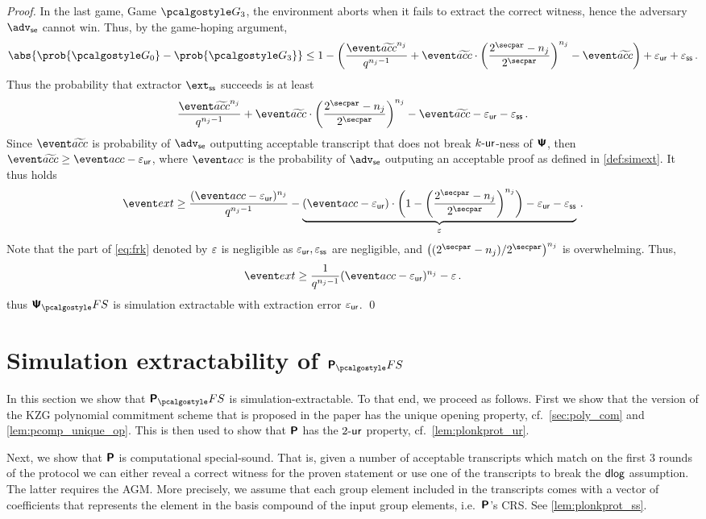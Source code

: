 \let\accentvec\vec \documentclass[runningheads]{llncs}
\begin{document}
\begin{proof}
In the last game, Game $\game{3}$, the environment aborts when it fails to
extract the correct witness, hence the adversary $\advse$ cannot win.  Thus,
by the game-hoping argument, 
\[
	\abs{\prob{\game{0}} - \prob{\game{3}}} \leq 1 -
	\left(\frac{\waccProb^{n_j}}{q^{n_j - 1}} + \waccProb \cdot
	\left(\frac{2^\secpar - n_j}{2^\secpar}\right)^{n_j} - \waccProb\right) + \epsur + \epsss\,.
\]
Thus the probability that extractor $\extss$ succeeds is at least
\[
	\frac{\waccProb^{n_j}}{q^{n_j - 1}} + 
	\waccProb \cdot
	\left( \frac{2^\secpar - n_j}{2^\secpar}\right)^{n_j} -
\waccProb - \epsur - \epsss\,.
\]
Since $\waccProb$ is probability of $\advse$ outputting acceptable transcript
that does not break ${k\text{-}\mathsf{ur}}$-ness of $\bm{\mathsf{\Psi}}$, then $\waccProb \geq \accProb -
\epsur$, where $\accProb$ is the probability of $\advse$ outputing an acceptable
proof as defined in \cref{def:simext}. It thus holds
\[
	\label{eq:frk}
	\extProb \geq \frac{(\accProb - \epsur)^{n_j}}{q^{n_j - 1}} -
	\underbrace{(\accProb - \epsur) \cdot \left( 1 -
		\left(\frac{2^\secpar - n_j}{2^\secpar}\right)^{n_j}\right)
- \epsur - \epsss}_{\eps}\,.
\]
Note that the part of \cref{eq:frk} denoted by $\varepsilon$ is negligible as
$\varepsilon_{\mathsf{ur}}, \varepsilon_{\mathsf{ss}}$ are negligible, and $\left(\infrac{(2^\secpar
- n_j)}{2^\secpar}\right)^{n_j}$ is overwhelming.
Thus, 
\[
	\extProb \geq \frac{1}{q^{n_j - 1}} (\accProb - \epsur)^{n_j} -\eps\,.
\] 
thus
$\psfs$ is simulation extractable with extraction error $\varepsilon_{\mathsf{ur}}$.
\qed
\end{proof}

\section{Simulation extractability of $\plonkprotfs$} 
In this section we show that $\plonkprotfs$ is simulation-extractable. To that
end, we proceed as follows. First we show that the version of the KZG polynomial
commitment scheme that is proposed in the \plonk{} paper has the unique opening
property, cf.~\cref{sec:poly_com} and \cref{lem:pcomp_unique_op}. This is then
used to show that $\bm{\mathsf{P}}$ has the ${2\text{-}\mathsf{ur}}$ property,
cf.~\cref{lem:plonkprot_ur}.

Next, we show that $\bm{\mathsf{P}}$ is computational special-sound. That is, given a
number of acceptable transcripts which match on the first 3 rounds of the
protocol we can either reveal a correct witness for the proven statement or use
one of the transcripts to break the $\mathsf{dlog}$ assumption. The latter requires the
AGM. More precisely, we assume that each group element included in the
transcripts comes with a vector of coefficients that represents the element in
the basis compound of the input group elements, i.e.~$\bm{\mathsf{P}}$'s CRS. See
\cref{lem:plonkprot_ss}.
\end{document}
